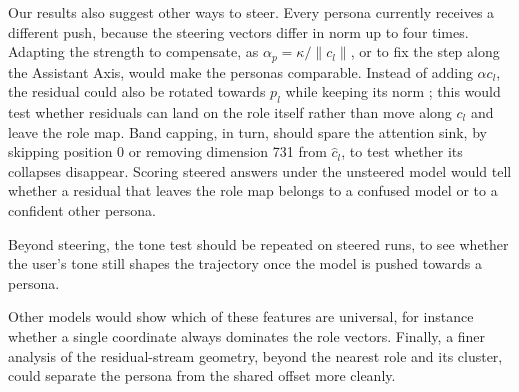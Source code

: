 Our results also suggest other ways to steer.
Every persona currently receives a different push, because the steering vectors differ in norm up to four times.
Adapting the strength to compensate, as $\alpha_p = \kappa / \lVert c_l \rVert$, or to fix the step along the Assistant Axis,
would make the personas comparable.
Instead of adding $\alpha c_l$, the residual could also be rotated towards $p_l$ while keeping its norm \citep{vuAngularSteeringBehavior2025, aparinGeometricAccountActivation2026};
this would test whether residuals can land on the role itself rather than move along $c_l$ and leave the role map.
Band capping, in turn, should spare the attention sink, by skipping position 0 or removing dimension 731 from $\hat{c}_l$,
to test whether its collapses disappear.
Scoring steered answers under the unsteered model would tell whether a residual that leaves the role map
belongs to a confused model or to a confident other persona.

Beyond steering, the tone test should be repeated on steered runs, to see whether the user's tone still shapes the trajectory once the model is pushed towards a persona.

Other models would show which of these features are universal, for instance whether a single coordinate always dominates the role vectors.
Finally, a finer analysis of the residual-stream geometry, beyond the nearest role and its cluster, could separate the persona from the shared offset more cleanly.
